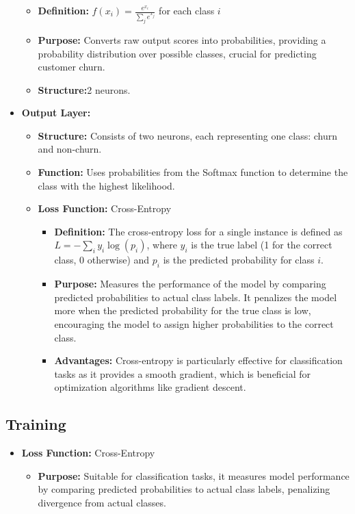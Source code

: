 \documentclass[12pt,a4paper]{article}
\begin{document}
\begin{itemize}
\begin{itemize}
        \item \textbf{Definition:} \( f(x_i) = \frac{e^{x_i}}{\sum_{j} e^{x_j}} \) for each class \( i \)
        \item \textbf{Purpose:} Converts raw output scores into probabilities, providing a probability distribution over possible classes, crucial for predicting customer churn.
        \item \textbf{Structure:}2 neurons.
    \end{itemize}
    \vspace{1cm}
    \item \textbf{Output Layer:}
    \begin{itemize}
        \item \textbf{Structure:} Consists of two neurons, each representing one class: churn and non-churn.
        \item \textbf{Function:} Uses probabilities from the Softmax function to determine the class with the highest likelihood.
        \item \textbf{Loss Function:} Cross-Entropy
        \begin{itemize}
            \item \textbf{Definition:} The cross-entropy loss for a single instance is defined as \( L = -\sum_{i} y_i \log(p_i) \), where \( y_i \) is the true label (1 for the correct class, 0 otherwise) and \( p_i \) is the predicted probability for class \( i \).
            \item \textbf{Purpose:} Measures the performance of the model by comparing predicted probabilities to actual class labels. It penalizes the model more when the predicted probability for the true class is low, encouraging the model to assign higher probabilities to the correct class.
            \item \textbf{Advantages:} Cross-entropy is particularly effective for classification tasks as it provides a smooth gradient, which is beneficial for optimization algorithms like gradient descent.
        \end{itemize}
    \end{itemize}
\end{itemize}

\subsection{Training}

\begin{itemize}
    \item \textbf{Loss Function:} Cross-Entropy
    \begin{itemize}
        \item \textbf{Purpose:} Suitable for classification tasks, it measures model performance by comparing predicted probabilities to actual class labels, penalizing divergence from actual classes.
    \end{itemize}
\end{itemize}
\end{document}
